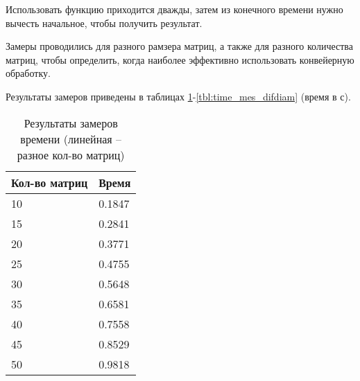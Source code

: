 Использовать функцию приходится дважды, затем из конечного времени нужно вычесть начальное, чтобы получить результат.

Замеры проводились для разного рамзера матриц, а также для разного количества матриц, чтобы определить, когда наиболее эффективно использовать конвейерную обработку.

Результаты замеров приведены в таблицах \ref{tbl:time_lin_count}-\ref{tbl:time_mes_difdiam} (время в с).

\begin{table}[h]
    \begin{center}
        \begin{threeparttable}
        \captionsetup{justification=raggedright,singlelinecheck=off}
        \caption{Результаты замеров времени (линейная -- разное кол-во матриц)}
        \label{tbl:time_lin_count}
        \begin{tabular}{|p{6cm}|p{6cm}|}
            \hline
            Кол-во матриц & Время \\
            \hline
            10 & 0.1847 \\ \hline 
            15 & 0.2841 \\ \hline 
            20 & 0.3771 \\ \hline 
            25 & 0.4755 \\ \hline 
            30 & 0.5648 \\ \hline 
            35 & 0.6581 \\ \hline 
            40 & 0.7558 \\ \hline 
            45 & 0.8529 \\ \hline 
            50 & 0.9818 \\ \hline  
		\end{tabular}
    \end{threeparttable}
\end{center}
\end{table}


